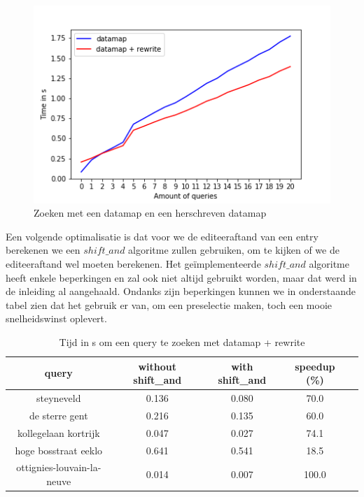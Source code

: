 \documentclass[11pt]{article}
\begin{document}
\begin{figure}[H]
        \centering
        \includegraphics[scale=0.75]{datamap_vs_rewrite.png}
        \caption{Zoeken met een datamap en een herschreven datamap}
\end{figure}

\newpage

Een volgende optimalisatie is dat voor we de editeeraftand van een entry berekenen we een $shift\_and$ algoritme zullen gebruiken, om te kijken of we de editeeraftand wel moeten berekenen. Het geïmplementeerde $shift\_and$ algoritme heeft enkele beperkingen en zal ook niet altijd gebruikt worden, maar dat werd in de inleiding al aangehaald. Ondanks zijn beperkingen kunnen we in onderstaande tabel zien dat het gebruik er van, om een preselectie maken, toch een mooie snelheidswinst oplevert.

\begin{table}[H]
        \centering
        \begin{tabular}{ |c|c|c|c|c| }
                \hline
                query & without shift\_and & with shift\_and & speedup (\%)\\
                \hline
                steyneveld                 & 0.136 & 0.080 &  70.0\\
                de sterre gent             & 0.216 & 0.135 &  60.0\\
                kollegelaan kortrijk       & 0.047 & 0.027 &  74.1\\ 
                hoge bosstraat eeklo       & 0.641 & 0.541 &  18.5\\
                ottignies-louvain-la-neuve & 0.014 & 0.007 &  100.0\\

                \hline
        \end{tabular}
        \caption{Tijd in s om een query te zoeken met datamap + rewrite}
\end{table}
\end{document}

